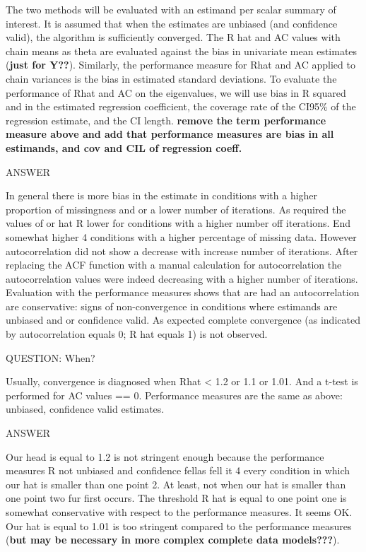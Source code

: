 \documentclass[Royal,times,sageh]{sagej}
\begin{document}
The two methods will be evaluated with an estimand per scalar summary of
interest. It is assumed that when the estimates are unbiased (and
confidence valid), the algorithm is sufficiently converged. The R hat
and AC values with chain means as theta are evaluated against the bias
in univariate mean estimates (\textbf{just for Y??}). Similarly, the
performance measure for Rhat and AC applied to chain variances is the
bias in estimated standard deviations. To evaluate the performance of
Rhat and AC on the eigenvalues, we will use bias in R squared and in the
estimated regression coefficient, the coverage rate of the CI95\% of the
regression estimate, and the CI length. \textbf{remove the term
performance measure above and add that performance measures are bias in
all estimands, and cov and CIL of regression coeff.}

ANSWER

In general there is more bias in the estimate in conditions with a
higher proportion of missingness and or a lower number of iterations. As
required the values of or hat R lower for conditions with a higher
number off iterations. End somewhat higher 4 conditions with a higher
percentage of missing data. However autocorrelation did not show a
decrease with increase number of iterations. After replacing the ACF
function with a manual calculation for autocorrelation the
autocorrelation values were indeed decreasing with a higher number of
iterations. Evaluation with the performance measures shows that are had
an autocorrelation are conservative: signs of non-convergence in
conditions where estimands are unbiased and or confidence valid. As
expected complete convergence (as indicated by autocorrelation equals 0;
R hat equals 1) is not observed.

QUESTION: When?

Usually, convergence is diagnosed when Rhat \textless{} 1.2 or 1.1 or
1.01. And a t-test is performed for AC values == 0. Performance measures
are the same as above: unbiased, confidence valid estimates.

ANSWER

Our head is equal to 1.2 is not stringent enough because the performance
measures R not unbiased and confidence fellas fell it 4 every condition
in which our hat is smaller than one point 2. At least, not when our hat
is smaller than one point two fur first occurs. The threshold R hat is
equal to one point one is somewhat conservative with respect to the
performance measures. It seems OK. Our hat is equal to 1.01 is too
stringent compared to the performance measures (\textbf{but may be
necessary in more complex complete data models???}).
\end{document}
